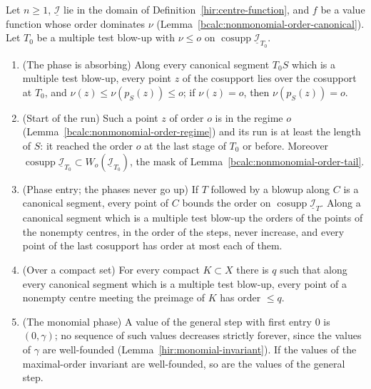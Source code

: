 \begin{lemma}
\label{bcalc:nonmonomial-order-global-phase}
\mixedleanok
Let \(n\ge1\), \(\underline{\mathcal I}\) lie in the domain of Definition~\ref{hir:centre-function}, and \(f\) be a value function whose order dominates \(\nu\)
(Lemma~\ref{bcalc:nonmonomial-order-canonical}). Let \(T_0\) be a multiple test blow-up with \(\nu\le o\) on \(\operatorname{cosupp}\underline{\mathcal I}_{T_0}\).
\begin{enumerate}
\item (The phase is absorbing) Along every canonical segment \(T_0S\) which is a multiple test blow-up, every point \(z\) of the cosupport lies over the cosupport at
\(T_0\), and \(\nu(z)\le\nu(p_S(z))\le o\); if \(\nu(z)=o\), then \(\nu(p_S(z))=o\).
\item (Start of the run) Such a point \(z\) of order \(o\) is in the regime \(o\) (Lemma~\ref{bcalc:nonmonomial-order-regime}) and its run is at least the length of
\(S\): it reached the order \(o\) at the last stage of \(T_0\) or before. Moreover \(\operatorname{cosupp}\underline{\mathcal I}_{T_0}\subset W_o(\underline{\mathcal I}_{T_0})\),
the mask of Lemma~\ref{bcalc:nonmonomial-order-tail}.
\item (Phase entry; the phases never go up) If \(T\) followed by a blowup along \(C\) is a canonical segment, every point of \(C\) bounds the order on
\(\operatorname{cosupp}\underline{\mathcal I}_T\). Along a canonical segment which is a multiple test blow-up the orders of the points of the nonempty centres, in the order
of the steps, never increase, and every point of the last cosupport has order at most each of them.
\item (Over a compact set) For every compact \(K\subset X\) there is \(q\) such that along every canonical segment which is a multiple test blow-up, every point of a
nonempty centre meeting the preimage of \(K\) has order \(\le q\).
\item (The monomial phase) A value of the general step with first entry \(0\) is \((0,\gamma)\); no sequence of such values decreases strictly forever, since the values
of \(\gamma\) are well-founded (Lemma~\ref{hir:monomial-invariant}). If the values of the maximal-order invariant are well-founded, so are the values of the general
step.
\end{enumerate}
\end{lemma}
